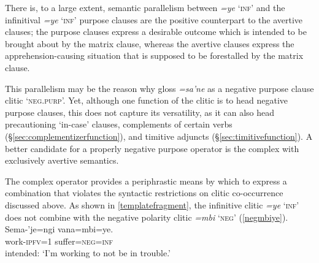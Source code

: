 \documentclass[output=paper,colorlinks,citecolor=brown]{langscibook}
\begin{document}
There is, to a large extent, semantic parallelism between \emph{=ye} `\textsc{inf}' and \sane[:] the infinitival \emph{=ye} `\textsc{inf}' purpose clauses are the positive counterpart to the avertive  clauses; the purpose  clauses express a desirable outcome which is intended to be brought about by the matrix clause, whereas the avertive  clauses express the apprehension-causing situation that is supposed to be forestalled by the matrix clause.

This parallelism may be the reason why \citet{fischerhengeveld} gloss \emph{=sa'ne} as a negative purpose clause clitic `\textsc{neg.purp}'. Yet, although one function of the clitic  is to head negative purpose clauses, this does not capture its versatility, as it can also head precautioning `in-case' clauses, complements of certain verbs (\S\ref{sec:complementizerfunction}), and timitive adjuncts (\S\ref{sec:timitivefunction}). %
A better candidate for a properly negative purpose operator is the complex  with exclusively avertive semantics.
    
The complex operator  provides a periphrastic means by which to express a combination that violates the syntactic restrictions on clitic co-occurrence discussed above. As shown in \autoref{templatefragment}, the infinitive clitic \emph{=ye} `\textsc{inf}' does not combine with the negative polarity clitic \emph{=mbi} `\textsc{neg}' (\ref{negmbiye}).
    \ea \label{negmbiye} %
    \gll \bad Sema-'je=ngi    {\ob}vana=mbi=ye.{\cb}\\
          work-\textsc{ipfv=1}  suffer=\textsc{neg=inf} \\
    \glt intended: `I'm working to not be in trouble.'
    \z
\end{document}
